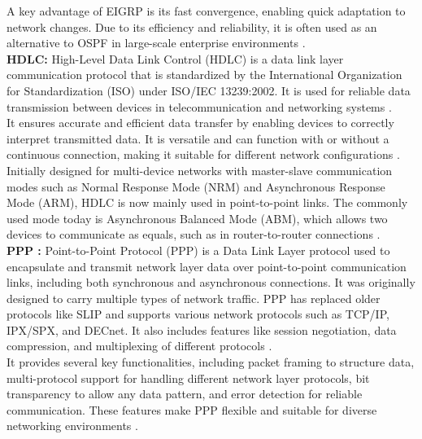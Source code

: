\documentclass[a4paper,12pt]{article}
\begin{document}
\noindent
A key advantage of EIGRP is its fast convergence, enabling quick adaptation to network changes. Due to its efficiency and reliability, it is often used as an alternative to OSPF in large-scale enterprise environments \cite{attouchi_eigrp_protocol}.\\

\noindent
\textbf{HDLC: } High-Level Data Link Control (HDLC) is a data link layer communication protocol that is standardized by the International Organization for Standardization (ISO) under ISO/IEC 13239:2002. It is used for reliable data transmission between devices in telecommunication and networking systems \cite{wikipedia_hdlc}.\\

\noindent
It ensures accurate and efficient data transfer by enabling devices to correctly interpret transmitted data. It is versatile and can function with or without a continuous connection, making it suitable for different network configurations \cite{wikipedia_hdlc}.\\

\noindent
Initially designed for multi-device networks with master-slave communication modes such as Normal Response Mode (NRM) and Asynchronous Response Mode (ARM), HDLC is now mainly used in point-to-point links. The commonly used mode today is Asynchronous Balanced Mode (ABM), which allows two devices to communicate as equals, such as in router-to-router connections \cite{wikipedia_hdlc}.\\

\noindent
\textbf{PPP :} Point-to-Point Protocol (PPP) is a Data Link Layer protocol used to encapsulate and transmit network layer data over point-to-point communication links, including both synchronous and asynchronous connections. It was originally designed to carry multiple types of network traffic. PPP has replaced older protocols like SLIP and supports various network protocols such as TCP/IP, IPX/SPX, and DECnet. It also includes features like session negotiation, data compression, and multiplexing of different protocols \cite{gfg_ppp_full_form}. \\

\noindent
It provides several key functionalities, including packet framing to structure data, multi-protocol support for handling different network layer protocols, bit transparency to allow any data pattern, and error detection for reliable communication. These features make PPP flexible and suitable for diverse networking environments \cite{gfg_ppp_full_form}. \\
\end{document}
